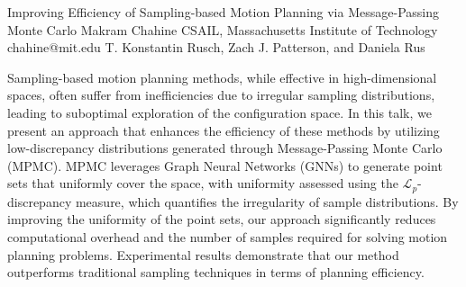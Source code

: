 \begin{talk}
  {Improving Efficiency of Sampling-based Motion Planning via Message-Passing Monte Carlo}%
  {Makram Chahine}%
  {CSAIL, Massachusetts Institute of Technology}%
  {chahine@mit.edu}%
  {T. Konstantin Rusch, Zach J. Patterson, and Daniela Rus}%
  
    
   
Sampling-based motion planning methods, while effective in high-dimensional spaces, often suffer from inefficiencies due to irregular sampling distributions, leading to suboptimal exploration of the configuration space. In this talk, we present an approach that enhances the efficiency of these methods by utilizing low-discrepancy distributions generated through Message-Passing Monte Carlo (MPMC). MPMC leverages Graph Neural Networks (GNNs) to generate point sets that uniformly cover the space, with uniformity assessed using the $\mathcal{L}_p$-discrepancy measure, which quantifies the irregularity of sample distributions. By improving the uniformity of the point sets, our approach significantly reduces computational overhead and the number of samples required for solving motion planning problems. Experimental results demonstrate that our method outperforms traditional sampling techniques in terms of planning efficiency.

\medskip


\end{talk}

